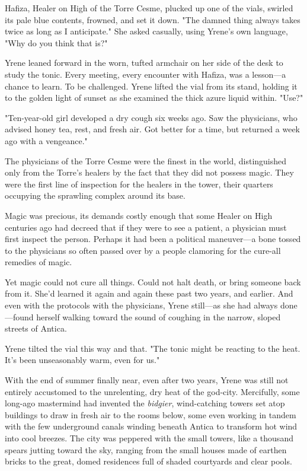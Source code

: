 Hafiza, Healer on High of the Torre Cesme, plucked up one of the vials, swirled its pale blue contents, frowned, and set it down.
"The damned thing always takes twice as long as I anticipate."
She asked casually, using Yrene's own language, "Why do you think that is?"

Yrene leaned forward in the worn, tufted armchair on her side of the desk to study the tonic.
Every meeting, every encounter with Hafiza, was a lesson---a chance to learn.
To be challenged.
Yrene lifted the vial from its stand, holding it to the golden light of sunset as she examined the thick azure liquid within.
"Use?"

"Ten-year-old girl developed a dry cough six weeks ago.
Saw the physicians, who advised honey tea, rest, and fresh air.
Got better for a time, but returned a week ago with a vengeance."

The physicians of the Torre Cesme were the finest in the world, distinguished only from the Torre's healers by the fact that they did not possess magic.
They were the first line of inspection for the healers in the tower, their quarters occupying the sprawling complex around its base.

Magic was precious, its demands costly enough that some Healer on High centuries ago had decreed that if they were to see a patient, a physician must first inspect the person.
Perhaps it had been a political maneuver---a bone tossed to the physicians so often passed over by a people clamoring for the cure-all remedies of magic.

Yet magic could not cure all things.
Could not halt death, or bring someone back from it.
She'd learned it again and again these past two years, and earlier.
And even with the protocols with the physicians, Yrene still---as she had always done---found herself walking toward the sound of coughing in the narrow, sloped streets of Antica.

Yrene tilted the vial this way and that.
"The tonic might be reacting to the heat.
It's been unseasonably warm, even for us."

With the end of summer finally near, even after two years, Yrene was still not entirely accustomed to the unrelenting, dry heat of the god-city.
Mercifully, some long-ago mastermind had invented the \emph{bidgier}, wind-catching towers set atop buildings to draw in fresh air to the rooms below, some even working in tandem with the few underground canals winding beneath Antica to transform hot wind into cool breezes.
The city was peppered with the small towers, like a thousand spears jutting toward the sky, ranging from the small houses made of earthen bricks to the great, domed residences full of shaded courtyards and clear pools.

